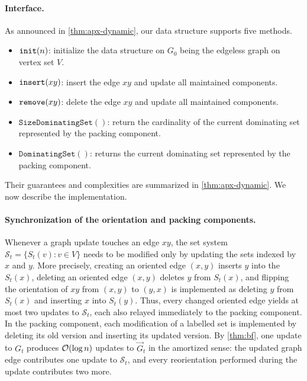 \paragraph{Interface.}
As announced in \cref{thm:apx-dynamic}, our data structure supports five methods.
\begin{itemize}
\item $\mathtt{init}(n)$: initialize the data structure on $G_0$ being the edgeless graph on vertex set $V$. 
\item $\mathtt{insert}(xy)$: insert the edge $xy$ and update all maintained components.
\item $\mathtt{remove}(xy)$: delete the edge $xy$ and update all maintained components.
\item $\mathtt{SizeDominatingSet()}$: return the cardinality of the current dominating set represented by the packing component.
\item $\mathtt{DominatingSet()}$: returns the current dominating set represented by the packing component.
\end{itemize}
Their guarantees and complexities are summarized in \cref{thm:apx-dynamic}. We now describe the implementation.

\paragraph{Synchronization of the orientation and packing components.}
Whenever a graph update touches an edge $xy$, the set system $\mathcal{S}_t=\{S_t(v)\colon v\in V\}$ needs to be modified only by updating the sets indexed by $x$ and $y$.
More precisely, creating an oriented edge $(x,y)$ inserts $y$ into the $S_t(x)$, deleting an oriented edge $(x,y)$ deletes $y$ from $S_t(x)$, and flipping the orientation of $xy$ from $(x,y)$ to $(y,x)$ is implemented as deleting $y$ from $S_t(x)$ and inserting $x$ into $S_t(y)$.
Thus, every changed oriented edge yields at most two updates to $\mathcal{S}_t$, each also relayed immediately to the packing component.
In the packing component, each modification of a labelled set is implemented by deleting its old version and inserting its updated version.
By \cref{thm:bf}, one update to $G_t$ produces $\mathcal{O}(\log n)$ updates to $\vec{G}_t$ in the amortized sense: the updated graph edge contributes one update to $\mathcal{S}_t$, and every reorientation performed during the update contributes two more.

